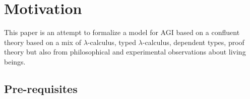 \newcommand{\alphaequivalence}{$\alpha$-equivalence\xspace}
\newcommand{\alphaequivalent}{$\alpha$-equivalent\xspace}
\newcommand{\alphaeq}{\equiv_\alpha}
\newcommand{\alphaconversion}{$\alpha$-conversion\xspace}

\newcommand{\stotau}{\ \triangleright_{\tau}\ }
\newcommand{\osteptaureduction}{one-step $\tau$-reduction\xspace}
\newcommand{\osteptaureductions}{one-step $\tau$-reductions\xspace}
\newcommand{\osteptaureducible}{one-step $\tau$-reducible\xspace}

\newcommand{\totau}{\to_{\tau}}
\newcommand{\taureduction}{$\tau$-reduction\xspace}
\newcommand{\tauconversion}{$\tau$-conversion\xspace}
\newcommand{\taureductions}{$\tau$-reductions\xspace}
\newcommand{\taureduce}{$\tau$-reduce\xspace}
\newcommand{\taureduces}{$\tau$-reduces\xspace}
\newcommand{\taureducible}{$\tau$-reducible\xspace}
\newcommand{\msteptaureduction}{multi-step $\tau$-reduction\xspace}
\newcommand{\msteptaureducible}{multi-step $\tau$-reducible\xspace}

\newcommand{\tauequivalence}{$\tau$-equivalence\xspace}
\newcommand{\tauequivalent}{$\tau$-equivalent\xspace}
\newcommand{\taueq}{=_{\tau}}

\newcommand{\betareduction}{$\beta$-reduction\xspace}
\newcommand{\betareduce}{$\beta$-reduces\xspace}

\newcommand{\quadvdash}{\quad \vdash \quad}
\newcommand{\quadand}{\quad\text{ and }\quad}


\section{Motivation}

This paper is an attempt to formalize a model for AGI based on a confluent theory based on a mix of $\lambda$-calculus, typed $\lambda$-calculus, dependent types, proof theory but also from philosophical and experimental observations about living beings.

\subsection{Pre-requisites}

